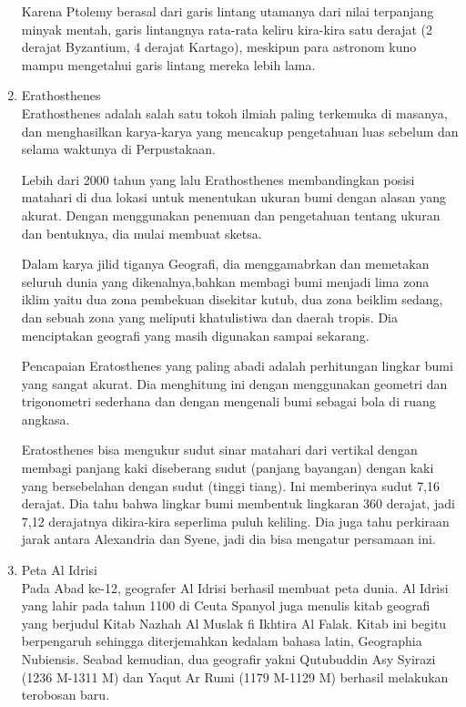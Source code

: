 \begin{enumerate}
Karena Ptolemy berasal dari garis lintang utamanya dari nilai terpanjang minyak mentah, garis lintangnya rata-rata keliru kira-kira satu derajat (2 derajat Byzantium, 4 derajat Kartago), meskipun para astronom kuno mampu mengetahui garis lintang mereka lebih lama.

\item Erathosthenes\\
Erathosthenes adalah salah satu tokoh ilmiah paling terkemuka di masanya, dan menghasilkan karya-karya yang mencakup pengetahuan luas sebelum dan selama waktunya di Perpustakaan.

Lebih dari 2000 tahun yang lalu Erathosthenes membandingkan posisi matahari di dua lokasi untuk menentukan ukuran bumi dengan alasan yang akurat. Dengan menggunakan penemuan dan pengetahuan tentang ukuran dan bentuknya, dia mulai membuat sketsa.

Dalam karya jilid tiganya Geografi, dia menggamabrkan dan memetakan seluruh dunia yang dikenalnya,bahkan membagi bumi menjadi lima zona iklim yaitu dua zona pembekuan disekitar kutub, dua zona beiklim sedang, dan sebuah zona yang meliputi khatulistiwa dan daerah tropis. Dia menciptakan geografi yang masih digunakan sampai sekarang.

Pencapaian Eratosthenes yang paling abadi adalah perhitungan lingkar bumi yang sangat akurat. Dia menghitung ini dengan menggunakan geometri dan trigonometri sederhana dan dengan mengenali bumi sebagai bola di ruang angkasa.

Eratosthenes bisa mengukur sudut sinar matahari dari vertikal dengan membagi panjang kaki diseberang sudut (panjang bayangan) dengan kaki yang bersebelahan dengan sudut (tinggi tiang). Ini memberinya sudut 7,16 derajat. Dia tahu bahwa lingkar bumi membentuk lingkaran 360 derajat, jadi 7,12 derajatnya dikira-kira seperlima puluh keliling. Dia juga tahu perkiraan jarak antara Alexandria dan Syene, jadi dia bisa mengatur persamaan ini.

\item Peta Al Idrisi\\
Pada Abad ke-12, geografer Al Idrisi berhasil membuat peta dunia. Al Idrisi yang lahir pada tahun 1100 di Ceuta Spanyol juga menulis kitab geografi yang berjudul Kitab Nazhah Al Muslak fi Ikhtira Al Falak. Kitab ini begitu berpengaruh sehingga diterjemahkan kedalam bahasa latin, Geographia Nubiensis. Seabad kemudian, dua geografir yakni Qutubuddin Asy Syirazi (1236 M-1311 M) dan Yaqut Ar Rumi (1179 M-1129 M) berhasil melakukan terobosan baru.


\end{enumerate}
